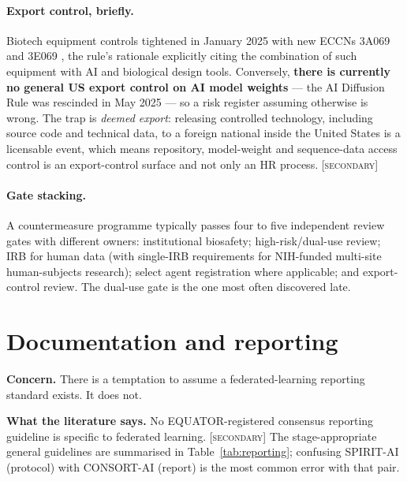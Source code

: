 \documentclass[11pt,a4paper]{article}
\newcommand{\flag}[1]{\textcolor{flagcolor}{\textbf{#1}}}
\newcommand{\secondary}{\textsc{[secondary]}}
\newcommand{\concern}[1]{\par\medskip\noindent\textbf{Concern.} #1}
\newcommand{\evidence}[1]{\par\smallskip\noindent\textbf{What the literature says.} #1}
\begin{document}
\paragraph{Export control, briefly.} Biotech equipment controls tightened in
January 2025 with new ECCNs 3A069 and 3E069 \citep{bis3a069}, the rule's
rationale explicitly citing the combination of such equipment with AI and
biological design tools. Conversely, \flag{there is currently no general US
export control on AI model weights} --- the AI Diffusion Rule was rescinded
in May 2025 \citep{bisdiffusionrescind} --- so a risk register assuming
otherwise is wrong. The trap is \emph{deemed export}: releasing controlled
technology, including source code and technical data, to a foreign national
inside the United States is a licensable event, which means repository,
model-weight and sequence-data access control is an export-control surface
and not only an HR process. \secondary

\paragraph{Gate stacking.} A countermeasure programme typically passes four
to five independent review gates with different owners: institutional
biosafety; high-risk/dual-use review; IRB for human data (with single-IRB
requirements for NIH-funded multi-site human-subjects research); select
agent registration where applicable; and export-control review. The
dual-use gate is the one most often discovered late.

\section{Documentation and reporting}

\concern{There is a temptation to assume a federated-learning reporting
standard exists. It does not.}

\evidence{No EQUATOR-registered consensus reporting guideline is specific to
federated learning. \secondary{} The stage-appropriate general guidelines
are summarised in Table~\ref{tab:reporting}; confusing SPIRIT-AI (protocol)
with CONSORT-AI (report) is the most common error with that pair.}
\end{document}
